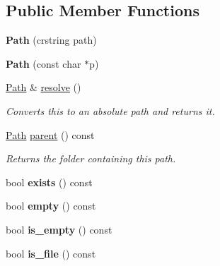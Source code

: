 \subsection*{Public Member Functions}
\begin{DoxyCompactItemize}
\item 
\mbox{\label{classnta_1_1utils_1_1Path_a1fe69ab28332246bb5c39fe31b322d0c}} 
{\bfseries Path} (crstring path)
\item 
\mbox{\label{classnta_1_1utils_1_1Path_a34f62db3f2752ebdb1b43021236e8ac2}} 
{\bfseries Path} (const char $\ast$p)
\item 
\mbox{\label{classnta_1_1utils_1_1Path_a05c3d1cf0849617292cedabb549c8669}} 
\hyperlink{classnta_1_1utils_1_1Path}{Path} \& \hyperlink{classnta_1_1utils_1_1Path_a05c3d1cf0849617292cedabb549c8669}{resolve} ()
\begin{DoxyCompactList}\small\item\em Converts this to an absolute path and returns it. \end{DoxyCompactList}\item 
\hyperlink{classnta_1_1utils_1_1Path}{Path} \hyperlink{classnta_1_1utils_1_1Path_aa124dc05466b3f681d02579fa0022a6a}{parent} () const
\begin{DoxyCompactList}\small\item\em Returns the folder containing this path. \end{DoxyCompactList}\item 
\mbox{\label{classnta_1_1utils_1_1Path_a211a5a235b5f7fba36caccf6e4688427}} 
bool {\bfseries exists} () const
\item 
\mbox{\label{classnta_1_1utils_1_1Path_a7455a919c629658fea5cb9bfe25197a3}} 
bool {\bfseries empty} () const
\item 
\mbox{\label{classnta_1_1utils_1_1Path_ae21913de2f7edabf943e12197ebd678f}} 
bool {\bfseries is\+\_\+empty} () const
\item 
\mbox{\label{classnta_1_1utils_1_1Path_ac72b706957b1cfe5b74f15cbd444a0db}} 
bool {\bfseries is\+\_\+file} () const

\end{DoxyCompactItemize}
